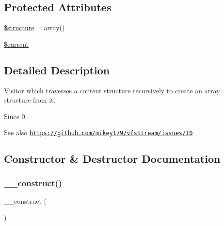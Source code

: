 \subsection*{Protected Attributes}
\begin{DoxyCompactItemize}
\item 
\mbox{\hyperlink{classorg_1_1bovigo_1_1vfs_1_1visitor_1_1vfs_stream_structure_visitor_aa78d61fba96a50ae36cf20c6de2b8e64}{\$structure}} = array()
\item 
\mbox{\hyperlink{classorg_1_1bovigo_1_1vfs_1_1visitor_1_1vfs_stream_structure_visitor_a2c4c58e377f6c66ca38c8ea97666fc5e}{\$current}}
\end{DoxyCompactItemize}


\subsection{Detailed Description}
Visitor which traverses a content structure recursively to create an array structure from it.

\begin{DoxySince}{Since}
0.. 
\end{DoxySince}
\begin{DoxySeeAlso}{See also}
\href{https://github.com/mikey179/vfsStream/issues/10}{\tt https\+://github.\+com/mikey179/vfs\+Stream/issues/10} 
\end{DoxySeeAlso}


\subsection{Constructor \& Destructor Documentation}
\mbox{\label{classorg_1_1bovigo_1_1vfs_1_1visitor_1_1vfs_stream_structure_visitor_a095c5d389db211932136b53f25f39685}} 
\subsubsection{\texorpdfstring{\+\_\+\+\_\+construct()}{\_\_construct()}}
{\footnotesize\ttfamily \+\_\+\+\_\+construct (\begin{DoxyParamCaption}{ }\end{DoxyParamCaption})}

